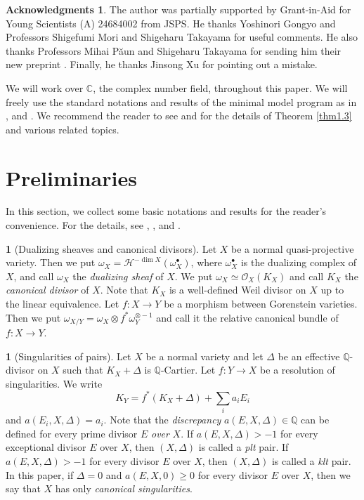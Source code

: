 \documentclass[12pt,twoside]{amsart}
\theoremstyle{definition}
\newtheorem*{ack}{Acknowledgments}
\newtheorem{say}[thm]{}
\begin{document}
\begin{ack}
The author was partially supported by Grant-in-Aid for 
Young Scientists (A) 24684002 from JSPS. 
He thanks Yoshinori Gongyo and Professors 
Shigefumi Mori and Shigeharu Takayama for useful comments. 
He also thanks Professors Mihai P\u aun and Shigeharu Takayama 
for sending him their new preprint \cite{paun-takayama}. 
Finally, he thanks Jinsong Xu for pointing out a mistake. 
\end{ack}

We will work over $\mathbb C$, the complex number field, throughout this paper. 
We will freely use the standard notations and results of 
the minimal model program as in 
\cite{kollar-mori}, \cite{fujino-fund} and \cite{fujino-foundation}. 
We recommend the reader to see \cite[\S 5]{mori} and \cite[Section 5]{fujino-remarks} 
for the details of Theorem \ref{thm1.3} and 
various related topics. 

\section{Preliminaries}\label{sec2}

In this section, we collect some basic notations and 
results for the reader's convenience. For the details, see \cite{kollar-mori}, 
\cite{fujino-fund}, and \cite{fujino-foundation}. 

\begin{say}[Dualizing sheaves and canonical divisors]\label{say2.1}
Let $X$ be a normal quasi-projective variety. 
Then we put $\omega_X=\mathcal H ^{-\dim X}(\omega^\bullet _X)$, 
where $\omega^\bullet _X$ is the dualizing complex of $X$, 
and call $\omega_X$ the {\em{dualizing sheaf}} of $X$. 
We put $\omega_X\simeq \mathcal O_X(K_X)$ and call $K_X$ the 
{\em{canonical divisor}} of $X$. 
Note that $K_X$ is a well-defined Weil divisor on $X$ up to the linear 
equivalence. 
Let $f:X\to Y$ be a morphism between Gorenstein varieties. 
Then we put $\omega_{X/Y}=\omega_X\otimes f^*\omega^{\otimes -1}_Y$ 
and call it the relative canonical bundle of $f:X\to Y$. 
\end{say}

\begin{say}[Singularities of pairs]\label{say2.2} 
Let $X$ be a normal variety and let $\Delta$ be an effective $\mathbb Q$-divisor 
on $X$ such that $K_X+\Delta$ is $\mathbb Q$-Cartier. 
Let $f:Y\to X$ be a resolution of singularities. 
We write $$K_Y=f^*(K_X+\Delta)+\sum _i a_i E_i$$ and 
$a(E_i, X, \Delta)=a_i$. 
Note that the {\em{discrepancy}} $a(E, X, \Delta)\in \mathbb Q$ can be 
defined for every prime divisor $E$ {\em{over}} $X$. 
If $a(E, X, \Delta)>-1$ for every exceptional divisor $E$ over $X$, 
then $(X, \Delta)$ is called a {\em{plt}} pair. 
If $a(E, X, \Delta)>-1$ for every divisor $E$ over $X$, then $(X, \Delta)$ is 
called a {\em{klt}} pair. 
In this paper, if $\Delta=0$ and $a(E, X, 0)\geq 0$ for 
every divisor $E$ over $X$, then we say that $X$ has only {\em{canonical 
singularities}}. 
\end{say}
\end{document}
